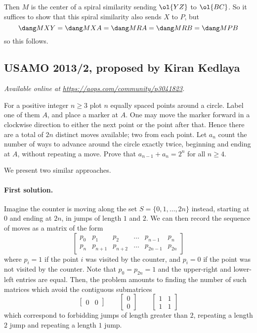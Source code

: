 \documentclass[11pt]{scrartcl}
\begin{document}
Then $M$ is the center of a spiral similarity sending
$\ol{YZ}$ to $\ol{BC}$.
So it suffices to show that this spiral similarity
also sends $X$ to $P$, but
\[ \dang MXY = \dang MXA = \dang MRA = \dang MRB = \dang MPB \]
so this follows.
\pagebreak

\subsection{USAMO 2013/2, proposed by Kiran Kedlaya}
\textsl{Available online at \url{https://aops.com/community/p3041823}.}
\begin{mdframed}[style=mdpurplebox,frametitle={Problem statement}]
For a positive integer $n\geq 3$ plot $n$
equally spaced points around a circle.
Label one of them $A$, and place a marker at $A$.
One may move the marker forward in a clockwise direction
to either the next point or the point after that.
Hence there are a total of $2n$ distinct moves available;
two from each point.
Let $a_n$ count the number of ways to advance
around the circle exactly twice,
beginning and ending at $A$, without repeating a move.
Prove that $a_{n-1}+a_n=2^n$ for all $n\geq 4$.
\end{mdframed}
We present two similar approaches.

\paragraph{First solution.}
Imagine the counter is moving along
the set $S = \{0, 1, \dots, 2n\}$ instead,
starting at $0$ and ending at $2n$, in jumps of length $1$ and $2$.
We can then record the sequence of moves as a matrix of the form
\[
  \begin{bmatrix}
    p_0 & p_1 & p_2 & \dots & p_{n-1} & p_n \\
    p_n & p_{n+1} & p_{n+2} & \dots & p_{2n-1} & p_{2n}
  \end{bmatrix}
\]
where $p_i = 1$ if the point $i$ was visited by the counter,
and $p_i = 0$ if the point was not visited by the counter.
Note that $p_0 = p_{2n} = 1$ and the upper-right and lower-left entries are equal.
Then, the problem amounts to finding the number of such matrices
which avoid the contiguous submatrices
\[
  \begin{bmatrix} 0 & 0 \end{bmatrix}
  \qquad
  \begin{bmatrix} 0 \\ 0 \end{bmatrix}
  \qquad
  \begin{bmatrix} 1 & 1 \\ 1 & 1 \end{bmatrix}
\]
which correspond to forbidding jumps of length greater than $2$,
repeating a length $2$ jump and repeating a length $1$ jump.
\end{document}
